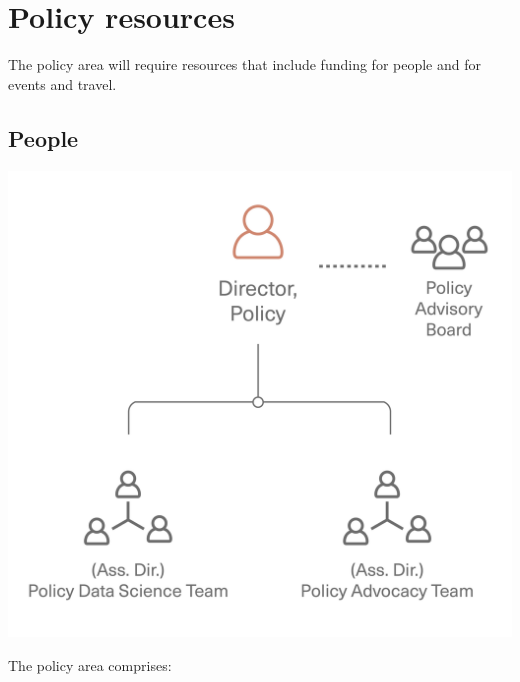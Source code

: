 \documentclass[
]{book}
\begin{document}
\hypertarget{policy-resources}{%
\section{Policy resources}\label{policy-resources}}

The policy area will require resources that include funding for people and for events and travel.

\hypertarget{people}{%
\subsection{People}\label{people}}

\includegraphics{images/policy_structure.png}

The policy area comprises:
\end{document}
